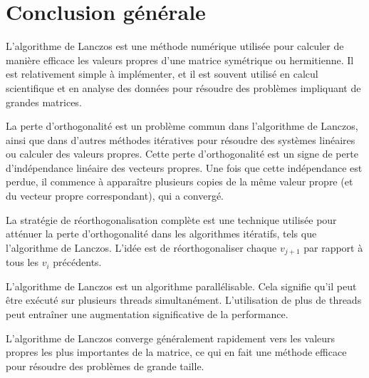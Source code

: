 \documentclass[11pt,french]{article}
\begin{document}
	\newpage
	\section{Conclusion générale}
	L'algorithme de Lanczos est une méthode numérique utilisée pour calculer de manière efficace les valeurs propres d'une matrice symétrique ou hermitienne. Il est relativement simple à implémenter, et il est souvent utilisé en calcul scientifique et en analyse des données pour résoudre des problèmes impliquant de grandes matrices.

    La perte d'orthogonalité est un problème commun dans l'algorithme de Lanczos, ainsi que dans d'autres méthodes itératives pour résoudre des systèmes linéaires ou calculer des valeurs propres. Cette perte d’orthogonalité est un signe de perte d’indépendance linéaire des vecteurs propres. Une fois que cette indépendance est perdue, il commence à apparaître plusieurs copies de la même valeur propre (et du vecteur propre correspondant), qui a convergé.

    La stratégie de réorthogonalisation complète est une technique utilisée pour atténuer la perte d'orthogonalité dans les algorithmes itératifs, tels que l'algorithme de Lanczos. L'idée est de réorthogonaliser chaque $v_{j+1}$ par rapport à tous les $v_i$ précédents.

    L'algorithme de Lanczos est un algorithme parallélisable. Cela signifie qu'il peut être exécuté sur plusieurs threads simultanément. L'utilisation de plus de threads peut entraîner une augmentation significative de la performance.
     
     L'algorithme de Lanczos converge généralement rapidement vers les valeurs propres les plus importantes de la matrice, ce qui en fait une méthode efficace pour résoudre des problèmes de grande taille.
\end{document}

